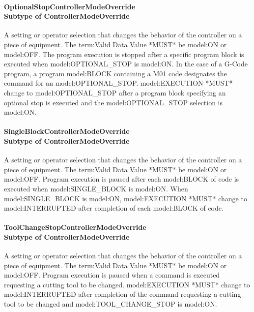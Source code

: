 \paragraph[OptionalStopControllerModeOverride]{OptionalStopControllerModeOverride \\ {\small Subtype of ControllerModeOverride}}\mbox{}
  \label{type:OptionalStopControllerModeOverride}

\FloatBarrier

A setting or operator selection that changes the behavior of the controller on a piece of equipment. 
 The {term:Valid Data Value} *MUST* be {model:ON} or {model:OFF}.
 The program execution is stopped after a specific program block is executed when {model:OPTIONAL_STOP} is {model:ON}.    
 In the case of a G-Code program, a program {model:BLOCK} containing a M01 code designates the command for an {model:OPTIONAL_STOP}. 
 {model:EXECUTION} *MUST* change to {model:OPTIONAL_STOP} after a program block specifying an optional stop is executed and the {model:OPTIONAL_STOP} selection is {model:ON}.

\paragraph[SingleBlockControllerModeOverride]{SingleBlockControllerModeOverride \\ {\small Subtype of ControllerModeOverride}}\mbox{}
  \label{type:SingleBlockControllerModeOverride}

\FloatBarrier

A setting or operator selection that changes the behavior of the controller on a piece of equipment. 
 The {term:Valid Data Value} *MUST* be {model:ON} or {model:OFF}.
 Program execution is paused after each {model:BLOCK} of code is executed when {model:SINGLE_BLOCK} is {model:ON}.   
 When {model:SINGLE_BLOCK} is {model:ON}, {model:EXECUTION} *MUST* change to {model:INTERRUPTED} after completion of each {model:BLOCK} of code. 

\paragraph[ToolChangeStopControllerModeOverride]{ToolChangeStopControllerModeOverride \\ {\small Subtype of ControllerModeOverride}}\mbox{}
  \label{type:ToolChangeStopControllerModeOverride}

\FloatBarrier

A setting or operator selection that changes the behavior of the controller on a piece of equipment. 
 The {term:Valid Data Value} *MUST* be {model:ON} or {model:OFF}. 
 Program execution is paused when a command is executed requesting a cutting tool to be changed. 
 {model:EXECUTION} *MUST* change to {model:INTERRUPTED} after completion of the command requesting a cutting tool to be changed and {model:TOOL_CHANGE_STOP} is {model:ON}.

